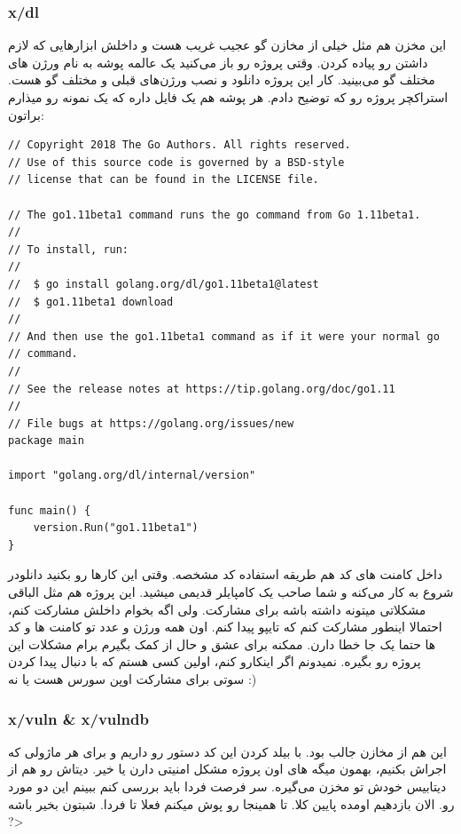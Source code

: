 \subsubsection{x/dl}
این مخزن هم مثل خیلی از مخازن گو عجیب غریب هست و داخلش ابزارهایی که لازم داشتن رو پیاده کردن.
وقتی پروژه رو باز می‌کنید یک عالمه پوشه به نام ورژن های مختلف گو می‌بینید. کار این پروژه دانلود و نصب ورژن‌های قبلی و مختلف گو هست.
استراکچر پروژه رو که توضیح دادم. هر پوشه هم یک فایل  داره که یک نمونه رو میذارم براتون:
\begin{latin}
\begin{verbatim}
// Copyright 2018 The Go Authors. All rights reserved.
// Use of this source code is governed by a BSD-style
// license that can be found in the LICENSE file.

// The go1.11beta1 command runs the go command from Go 1.11beta1.
//
// To install, run:
//
//  $ go install golang.org/dl/go1.11beta1@latest
//  $ go1.11beta1 download
//
// And then use the go1.11beta1 command as if it were your normal go
// command.
//
// See the release notes at https://tip.golang.org/doc/go1.11
//
// File bugs at https://golang.org/issues/new
package main

import "golang.org/dl/internal/version"

func main() {
    version.Run("go1.11beta1")
}
\end{verbatim}
\end{latin}

داخل کامنت های کد هم طریقه استفاده کد مشخصه. وقتی این کارها رو بکنید دانلودر شروع به کار می‌کنه و شما صاحب یک کامپایلر قدیمی میشید.
این پروژه هم مثل الباقی مشکلاتی میتونه داشته باشه برای مشارکت. ولی اگه بخوام داخلش مشارکت کنم، احتمالا اینطور مشارکت کنم که تایپو پیدا کنم.
اون همه ورژن و عدد تو کامنت ها و کد ها حتما یک جا خطا دارن. ممکنه برای عشق و حال از  کمک بگیرم برام مشکلات این پروژه رو بگیره.
نمیدونم اگر اینکارو کنم، اولین کسی هستم که با  دنبال پیدا کردن سوتی برای مشارکت اوپن سورس هست یا نه :)

\subsubsection{x/vuln \& x/vulndb}
این هم از مخازن جالب بود. با بیلد کردن این کد دستور  رو داریم و برای هر ماژولی که اجراش بکنیم، بهمون میگه های
اون پروژه مشکل امنیتی دارن یا خیر. دیتاش رو هم از دیتابیس خودش تو مخزن  می‌گیره.
سر فرصت فردا باید بررسی کنم ببینم این  دو مورد رو. الان بازدهیم اومده پایین کلا. تا همینجا رو پوش میکنم فعلا تا فردا.
شبتون بخیر باشه ?>

